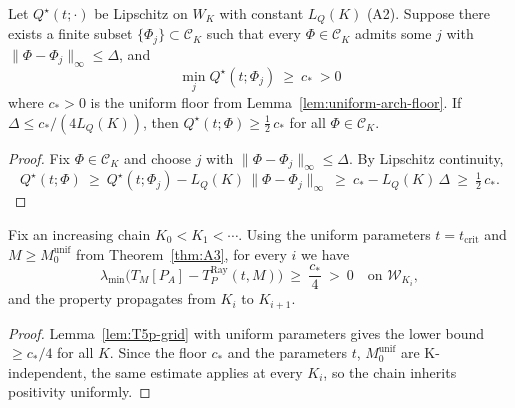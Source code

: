 \begin{lemma}\label{lem:t5-grid-lip}
Let $Q^\star(t;\cdot)$ be Lipschitz on $W_K$ with constant $L_Q(K)$ (\textup{A2}). Suppose there exists a finite subset
$\{\Phi_j\}\subset\mathcal C_K$ such that every $\Phi\in\mathcal C_K$ admits some $j$ with
$\|\Phi-\Phi_j\|_\infty\le \Delta$, and
\[
  \min_j Q^\star(t;\Phi_j)\ \ge\ c_*\ > 0
\]
where $c_*>0$ is the uniform floor from Lemma~\ref{lem:uniform-arch-floor}. If $\Delta\le c_*/(4L_Q(K))$, then
$Q^\star(t;\Phi)\ge \tfrac12\,c_*$ for all $\Phi\in\mathcal C_K$.
\end{lemma}
\begin{proof}
Fix $\Phi\in\mathcal C_K$ and choose $j$ with $\|\Phi-\Phi_j\|_\infty\le \Delta$. By Lipschitz continuity,
\[
  Q^\star(t;\Phi)\ \ge\ Q^\star(t;\Phi_j) - L_Q(K)\,\|\Phi-\Phi_j\|_\infty
  \ \ge\ c_* - L_Q(K)\,\Delta\ \ge\ \tfrac12\,c_*.
\]
\end{proof}

\begin{lemma}\label{t5:lem:T5-inheritance}
Fix an increasing chain $K_0<K_1<\cdots$. Using the uniform parameters
$t=t_{\mathrm{crit}}$ and $M\ge M_0^{\mathrm{unif}}$
from Theorem~\ref{thm:A3}, for every $i$ we have
\begin{equation}\label{eq:T5-uniform-inheritance}
  \lambda_{\min}\big(T_{M}[P_A]-T_P^{\mathrm{Ray}}(t,M)\big)
  \ \ge\ \frac{c_*}{4}\ >\ 0
  \quad\text{on }\mathcal W_{K_i},
\end{equation}
and the property propagates from $K_i$ to $K_{i+1}$.
\end{lemma}
\begin{proof}
Lemma~\ref{lem:T5p-grid} with uniform parameters gives the lower bound $\ge c_*/4$ for all $K$.
Since the floor $c_*$ and the parameters $t$, $M_0^{\mathrm{unif}}$ are K-independent,
the same estimate applies at every $K_i$, so the chain inherits positivity uniformly.
\end{proof}
